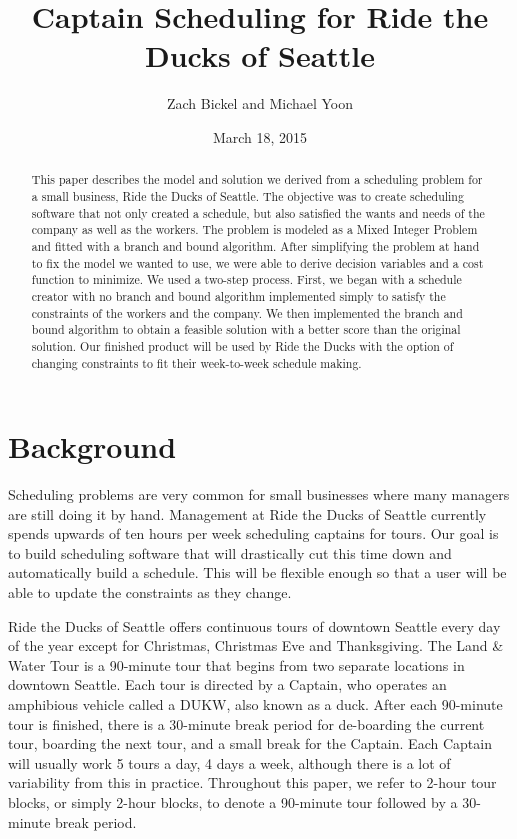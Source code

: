 \documentclass[12pt]{article}
\begin{document}
\title{Captain Scheduling for Ride the Ducks of Seattle} 

\author{Zach Bickel and Michael Yoon}
\date{March 18, 2015}
\maketitle

\begin{abstract}
This paper describes the model and solution we derived from a scheduling problem for a 
small business, Ride the Ducks of Seattle. The objective was to create scheduling 
software that not only created a schedule, but also satisfied the wants and needs of the 
company as well as the workers. The problem is modeled as a Mixed Integer Problem 
and fitted with a branch and bound algorithm. After simplifying the problem at hand to 
fix the model we wanted to use, we were able to derive decision variables and a cost 
function to minimize. We used a two-step process. First, we began with a schedule 
creator with no branch and bound algorithm implemented simply to satisfy the constraints of the 
workers and the company. We then implemented the 
branch and bound algorithm to obtain a feasible solution with a better score than the original solution. Our finished product will be used 
by Ride the Ducks with the option of changing constraints to fit their week-to-week 
schedule making.
\end{abstract}


\section*{Background}
Scheduling problems are very common for small businesses where many managers are still doing it by hand. Management at Ride the Ducks of Seattle currently spends upwards of ten hours per week scheduling captains for tours. Our goal is to build scheduling software that will drastically cut this time down and automatically build a schedule. This will be flexible enough so that a user will be able to update the constraints as they change. 

Ride the Ducks of Seattle offers continuous tours of downtown Seattle every day of the year except for Christmas, Christmas Eve and Thanksgiving. The Land \& Water Tour is a 90-minute tour that begins from two separate locations in downtown Seattle. Each tour is directed by a Captain, who operates an amphibious vehicle called a DUKW, also known as a duck. After each 90-minute tour is finished, there is a 30-minute break period for de-boarding the current tour, boarding the next tour, and a small break for the Captain. Each Captain will usually work 5 tours a day, 4 days a week, although there is a lot of variability from this in practice. Throughout this paper, we refer to 2-hour tour blocks, or simply 2-hour blocks, to denote a 90-minute tour followed by a 30-minute break period.
\end{document}
